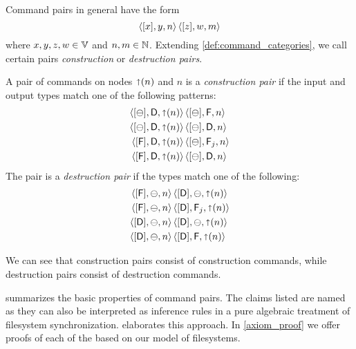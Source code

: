 Command pairs in general have the form
\[ \cxynv\cc  \czwmv \]
where $x,y,z,w\in\setv$ and $n,m\in\setn$. 
Extending \cref{def:command_categories}, we call certain pairs
\emph{construction} or \emph{destruction pairs}.

\begin{mydef}
A pair of commands on nodes $\pn$ and $n$
is a \emph{construction pair} if the input and output types match
one of the following patterns:
   \begin{align*}
            \cbda{\pn}&\cc  \cbfa{n} \\
            \cbda{\pn}&\cc  \cbda{n} \\
            \cfda{\pn}&\cc  \caaa{\empt}{\valff}{n} \\
            \cfda{\pn}&\cc  \cbda{n}
   \end{align*}
The pair is a \emph{destruction pair} if the types match one of the following:
   \begin{align*}
            \cfba{n}&\cc  \cdba{\pn} \\
            \cfba{n}&\cc  \caaa{\vald}{\valff}{\pn} \\
            \cdba{n}&\cc  \cdba{\pn} \\
            \cdba{n}&\cc  \cdfa{\pn}
   \end{align*}
\end{mydef}

We can see that construction pairs consist of construction commands,
while destruction pairs consist of destruction commands.




 summarizes the basic properties of command pairs.
The claims listed are named \emph{}
as they can also be interpreted as inference rules in a pure
algebraic treatment of filesystem synchronization.
 elaborates this approach.
In \cref{axiom_proof} we offer proofs of each of the
\emph{} based on our model of filesystems.


